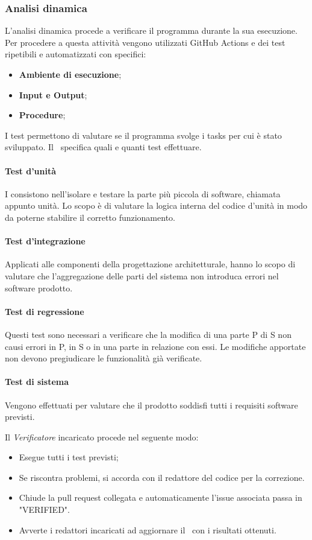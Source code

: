 \subsubsection{Analisi dinamica}
L'analisi dinamica procede a verificare il programma durante la sua esecuzione. Per procedere a questa attività vengono utilizzati GitHub Actions e dei test ripetibili e automatizzati con specifici:
\begin{itemize}
	\item \textbf{Ambiente di esecuzione};
	\item \textbf{Input e Output};
	\item \textbf{Procedure};
\end{itemize}

\label{Tests}I test permettono di valutare se il programma svolge i tasks per cui è stato sviluppato. Il \PdQv{}\ specifica quali e quanti test effettuare.
\paragraph*{Test d'unità}
I  consistono nell'isolare e testare la parte più piccola di software, chiamata appunto unità. Lo scopo è di valutare la logica interna del codice d'unità in modo da poterne stabilire il corretto funzionamento. 
\paragraph*{Test d'integrazione}
Applicati alle componenti della progettazione architetturale, hanno lo scopo di valutare che l'aggregazione delle parti del sistema non introduca errori nel software prodotto.
\paragraph*{Test di regressione}
Questi test sono necessari a verificare che la modifica di una parte P di S non causi errori in P, in S o in una parte in relazione con essi. Le modifiche apportate non devono pregiudicare le funzionalità già verificate. 
\paragraph*{Test di sistema}
Vengono effettuati per valutare che il prodotto soddisfi tutti i requisiti software previsti.

\label{ProceduraVerifica}Il \textit{Verificatore} incaricato procede nel seguente modo:
\begin{itemize}
	\item Esegue tutti i test previsti;
	\item Se riscontra problemi, si accorda con il redattore del codice per la correzione. 
	\item Chiude la pull request collegata e automaticamente l'issue associata passa in "VERIFIED".
	\item Avverte i redattori incaricati ad aggiornare il \PdQv\ con i risultati ottenuti.
\end{itemize}